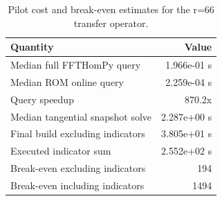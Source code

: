 \begin{table}
\centering
\small
\caption{Pilot cost and break-even estimates for the r=66 transfer operator.}
\label{tab:cost}
\begin{tabular}{lr}
\toprule
Quantity & Value \\
\midrule
Median full FFTHomPy query & 1.966e-01 s \\
Median ROM online query & 2.259e-04 s \\
Query speedup & 870.2x \\
Median tangential snapshot solve & 2.287e+00 s \\
Final build excluding indicators & 3.805e+01 s \\
Executed indicator sum & 2.552e+02 s \\
Break-even excluding indicators & 194 \\
Break-even including indicators & 1494 \\
\bottomrule
\end{tabular}
\end{table}
